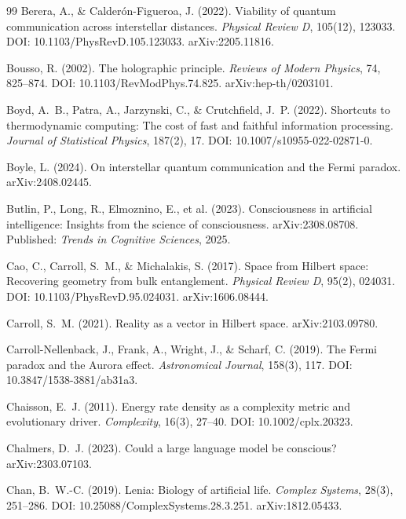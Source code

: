 \documentclass[12pt, a4paper]{article}
\begin{document}
\begin{thebibliography}{99}
Berera, A., \& Calder\'{o}n-Figueroa, J. (2022). Viability of quantum communication across
interstellar distances. \textit{Physical Review D}, 105(12), 123033.
DOI: 10.1103/PhysRevD.105.123033. arXiv:2205.11816.

Bousso, R. (2002). The holographic principle. \textit{Reviews of Modern Physics}, 74,
825--874. DOI: 10.1103/RevModPhys.74.825. arXiv:hep-th/0203101.

Boyd, A.~B., Patra, A., Jarzynski, C., \& Crutchfield, J.~P. (2022). Shortcuts to
thermodynamic computing: The cost of fast and faithful information processing.
\textit{Journal of Statistical Physics}, 187(2), 17.
DOI: 10.1007/s10955-022-02871-0.

Boyle, L. (2024). On interstellar quantum communication and the Fermi paradox.
arXiv:2408.02445.

Butlin, P., Long, R., Elmoznino, E., et al. (2023). Consciousness in artificial
intelligence: Insights from the science of consciousness. arXiv:2308.08708. Published:
\textit{Trends in Cognitive Sciences}, 2025.

Cao, C., Carroll, S.~M., \& Michalakis, S. (2017). Space from Hilbert space: Recovering
geometry from bulk entanglement. \textit{Physical Review D}, 95(2), 024031.
DOI: 10.1103/PhysRevD.95.024031. arXiv:1606.08444.

Carroll, S.~M. (2021). Reality as a vector in Hilbert space. arXiv:2103.09780.

Carroll-Nellenback, J., Frank, A., Wright, J., \& Scharf, C. (2019). The Fermi paradox and
the Aurora effect. \textit{Astronomical Journal}, 158(3), 117.
DOI: 10.3847/1538-3881/ab31a3.

Chaisson, E.~J. (2011). Energy rate density as a complexity metric and evolutionary driver.
\textit{Complexity}, 16(3), 27--40. DOI: 10.1002/cplx.20323.

Chalmers, D.~J. (2023). Could a large language model be conscious? arXiv:2303.07103.

Chan, B.~W.-C. (2019). Lenia: Biology of artificial life. \textit{Complex Systems},
28(3), 251--286. DOI: 10.25088/ComplexSystems.28.3.251. arXiv:1812.05433.


\end{thebibliography}
\end{document}
